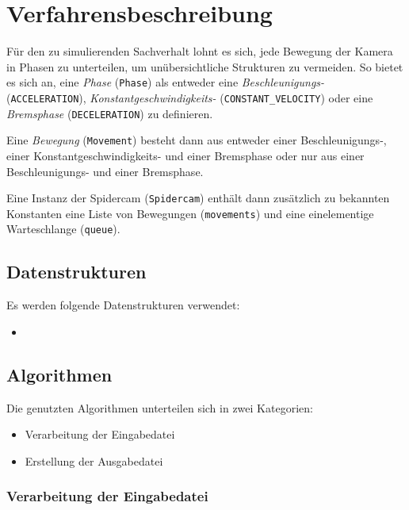 \section{Verfahrensbeschreibung}
\label{sec:verfahrensbeschreibung}

Für den zu simulierenden Sachverhalt lohnt es sich, jede Bewegung der Kamera in Phasen zu unterteilen, um unübersichtliche Strukturen zu vermeiden.
So bietet es sich an, eine \emph{Phase} (\texttt{Phase}) als entweder eine \emph{Beschleunigungs-} (\texttt{ACCELERATION}), \emph{Konstantgeschwindigkeits-} (\texttt{CONSTANT\_VELOCITY}) oder eine \emph{Bremsphase} (\texttt{DECELERATION}) zu definieren.

Eine \emph{Bewegung} (\texttt{Movement}) besteht dann aus entweder einer Beschleunigungs-, einer Konstantgeschwindigkeits- und einer Bremsphase oder nur aus einer Beschleunigungs- und einer Bremsphase.

Eine Instanz der Spidercam (\texttt{Spidercam}) enthält dann zusätzlich zu bekannten Konstanten eine Liste von Bewegungen (\texttt{movements}) und eine einelementige Warteschlange (\texttt{queue}).

\subsection{Datenstrukturen}
\label{ssec:datenstrukturen}

Es werden folgende Datenstrukturen verwendet:

\begin{itemize}
    \item
\end{itemize}

\subsection{Algorithmen}
\label{ssec:algorithmen}

Die genutzten Algorithmen unterteilen sich in zwei Kategorien:
\begin{itemize}
    \item Verarbeitung der Eingabedatei
    \item Erstellung der Ausgabedatei
\end{itemize}

\subsubsection{Verarbeitung der Eingabedatei}
\label{sssec:verarbeitung_der_eingabedatei}

